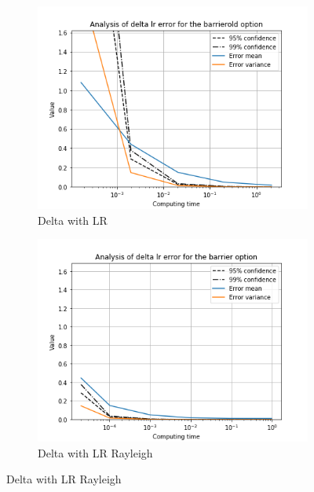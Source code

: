 \documentclass[11pt,a4paper,fleqn]{article}
\begin{document}
\begin{figure}[h!]
  \centering
      \begin{subfigure}[b]{0.45\textwidth}
          \includegraphics[width=\textwidth]{graphs/barrierolddeltalrtime.png}
          \caption{Delta with LR}
      \end{subfigure}
      \begin{subfigure}[b]{0.45\textwidth}
          \includegraphics[width=\textwidth]{graphs/barrierdeltalrtime.png}
          \caption{Delta with LR Rayleigh}
      \end{subfigure}


\end{figure}
\end{document}
